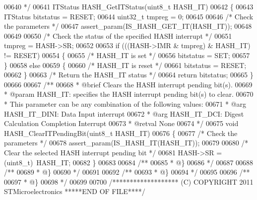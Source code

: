 \begin{DoxyCode}
00640 \textcolor{comment}{  */}
00641 ITStatus HASH_GetITStatus(uint8\_t HASH\_IT)
00642 \{
00643   ITStatus bitstatus = RESET;
00644   uint32\_t tmpreg = 0;
00645 
00646   \textcolor{comment}{/* Check the parameters */}
00647   assert_param(IS\_HASH\_GET\_IT(HASH\_IT));
00648 
00649 
00650   \textcolor{comment}{/* Check the status of the specified HASH interrupt */}
00651   tmpreg =  HASH->SR;
00652 
00653   \textcolor{keywordflow}{if} (((HASH->IMR & tmpreg) & HASH\_IT) != RESET)
00654   \{
00655     \textcolor{comment}{/* HASH\_IT is set */}
00656     bitstatus = SET;
00657   \}
00658   \textcolor{keywordflow}{else}
00659   \{
00660     \textcolor{comment}{/* HASH\_IT is reset */}
00661     bitstatus = RESET;
00662   \}
00663   \textcolor{comment}{/* Return the HASH\_IT status */}
00664   \textcolor{keywordflow}{return} bitstatus;
00665 \}
00666 
00667 \textcolor{comment}{/**}
00668 \textcolor{comment}{  * @brief  Clears the HASH interrupt pending bit(s).}
00669 \textcolor{comment}{  * @param  HASH\_IT: specifies the HASH interrupt pending bit(s) to clear.}
00670 \textcolor{comment}{  *          This parameter can be any combination of the following values:}
00671 \textcolor{comment}{  *            @arg HASH\_IT\_DINI: Data Input interrupt}
00672 \textcolor{comment}{  *            @arg HASH\_IT\_DCI: Digest Calculation Completion Interrupt}
00673 \textcolor{comment}{  * @retval None}
00674 \textcolor{comment}{  */}
00675 \textcolor{keywordtype}{void} HASH_ClearITPendingBit(uint8\_t HASH\_IT)
00676 \{
00677   \textcolor{comment}{/* Check the parameters */}
00678   assert_param(IS\_HASH\_IT(HASH\_IT));
00679 
00680   \textcolor{comment}{/* Clear the selected HASH interrupt pending bit */}
00681   HASH->SR = (uint8\_t)~HASH\_IT;
00682 \}
00683 
00684 \textcolor{comment}{/**}
00685 \textcolor{comment}{  * @\}}
00686 \textcolor{comment}{  */}
00687 
00688 \textcolor{comment}{/**}
00689 \textcolor{comment}{  * @\}}
00690 \textcolor{comment}{  */}
00691 
00692 \textcolor{comment}{/**}
00693 \textcolor{comment}{  * @\}}
00694 \textcolor{comment}{  */}
00695 
00696 \textcolor{comment}{/**}
00697 \textcolor{comment}{  * @\}}
00698 \textcolor{comment}{  */}
00699 
00700 \textcolor{comment}{/******************* (C) COPYRIGHT 2011 STMicroelectronics *****END OF FILE****/}
\end{DoxyCode}
